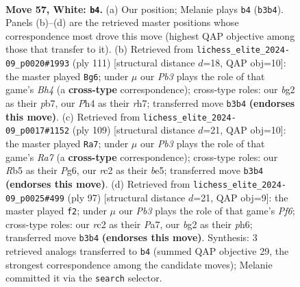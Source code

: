 \documentclass[11pt]{article}
\begin{document}
\clearpage

\begin{figure}[p]\centering
\begin{subfigure}{0.46\textwidth}\centering
\resizebox{\linewidth}{!}{%
\newchessgame
\chessboard[
  setfen={4k3/5p2/6p1/1R6/7P/1P6/2r3b1/R5K1 w - - 0 57},
  showmover=false,
  pgfstyle=straightmove, color=movearrow, markmove={b3-b4}
]}
\caption{}
\end{subfigure}\hfill
\begin{subfigure}{0.46\textwidth}\centering
\resizebox{\linewidth}{!}{%
\newchessgame
\chessboard[
  setfen={1k4r1/1P5R/2B2p2/2K4b/5P1p/8/8/8 b - - 7 56},
  showmover=false,
  pgfstyle=straightmove, color=movearrow, markmove={h5-g6}
]}
\caption{}
\end{subfigure}
\\[4pt]
\begin{subfigure}{0.46\textwidth}\centering
\resizebox{\linewidth}{!}{%
\newchessgame
\chessboard[
  setfen={3K4/8/1r4p1/4B3/7p/1kP4P/r7/8 b - - 1 55},
  showmover=false,
  pgfstyle=straightmove, color=movearrow, markmove={a2-a7}
]}
\caption{}
\end{subfigure}\hfill
\begin{subfigure}{0.46\textwidth}\centering
\resizebox{\linewidth}{!}{%
\newchessgame
\chessboard[
  setfen={8/p4r1k/7P/6K1/Pp6/1P3p2/8/3R4 b - - 1 49},
  showmover=false,
  pgfstyle=straightmove, color=movearrow, markmove={f3-f2}
]}
\caption{}
\end{subfigure}
\caption{\textbf{Move 57, White: \texttt{b4}.} (a) Our position; Melanie plays \texttt{b4} (\texttt{b3b4}). Panels (b)--(d) are the retrieved master positions whose correspondence most drove this move (highest QAP objective among those that transfer to it). (b) Retrieved from \texttt{lichess\_elite\_2024-09\_p0020\#1993} (ply 111) [structural distance $d$=18, QAP obj=10]: the master played \texttt{Bg6}; under $\mu$ our \emph{Pb3} plays the role of that game's \emph{Bh4} (a \textbf{cross-type} correspondence); cross-type roles: our \emph{b}g2 as their \emph{p}b7, our \emph{P}h4 as their \emph{r}h7; transferred move \texttt{b3b4} \textbf{(endorses this move)}. (c) Retrieved from \texttt{lichess\_elite\_2024-09\_p0017\#1152} (ply 109) [structural distance $d$=21, QAP obj=10]: the master played \texttt{Ra7}; under $\mu$ our \emph{Pb3} plays the role of that game's \emph{Ra7} (a \textbf{cross-type} correspondence); cross-type roles: our \emph{R}b5 as their \emph{P}g6, our \emph{r}c2 as their \emph{b}e5; transferred move \texttt{b3b4} \textbf{(endorses this move)}. (d) Retrieved from \texttt{lichess\_elite\_2024-09\_p0025\#499} (ply 97) [structural distance $d$=21, QAP obj=9]: the master played \texttt{f2}; under $\mu$ our \emph{Pb3} plays the role of that game's \emph{Pf6}; cross-type roles: our \emph{r}c2 as their \emph{P}a7, our \emph{b}g2 as their \emph{p}h6; transferred move \texttt{b3b4} \textbf{(endorses this move)}. Synthesis: 3 retrieved analogs transferred to \texttt{b4} (summed QAP objective 29, the strongest correspondence among the candidate moves); Melanie committed it via the \texttt{search} selector.}
\label{fig:thought-m112}
\end{figure}
\end{document}
